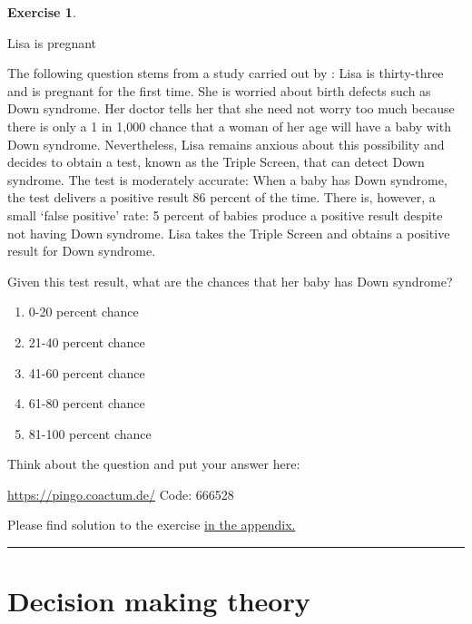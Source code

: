 \documentclass[
  12pt,
  oneside]{book}
\providecommand{\tightlist}{%
  \setlength{\itemsep}{0pt}\setlength{\parskip}{0pt}}
\theoremstyle{definition}
\theoremstyle{definition}
\theoremstyle{definition}
\newtheorem{exercise}{Exercise}[chapter]
\theoremstyle{definition}
\theoremstyle{remark}
\begin{document}
\begin{exercise}
\protect\hypertarget{exr:lisapregnant}{}\label{exr:lisapregnant}

Lisa is pregnant

The following question stems from a study carried out by \citet{Kahneman1972Subjective}: Lisa is thirty-three and is pregnant for the first time. She is worried about birth defects such as Down syndrome. Her doctor tells her that she need not worry too much because there is only a 1 in 1,000 chance that a woman of her age will have a baby with Down syndrome. Nevertheless, Lisa remains anxious about this possibility and decides to obtain a test, known as the Triple Screen, that can detect Down syndrome. The test is moderately accurate: When a baby has Down syndrome, the test delivers a positive result 86 percent of the time. There is, however, a small `false positive' rate: 5 percent of babies produce a positive result despite not having Down syndrome. Lisa takes the Triple Screen and obtains a positive result for Down syndrome.

Given this test result, what are the chances that her baby has Down syndrome?

\begin{enumerate}
\def\labelenumi{\alph{enumi})}
\tightlist
\item
  0-20 percent chance
\item
  21-40 percent chance
\item
  41-60 percent chance
\item
  61-80 percent chance
\item
  81-100 percent chance
\end{enumerate}

Think about the question and put your answer here:

\url{https://pingo.coactum.de/} Code: 666528

Please find solution to the exercise \hyperref[sol:lisapregnant]{in the appendix.}

\begin{center}\rule{0.5\linewidth}{0.5pt}\end{center}

\end{exercise}

\chapter{Decision making theory}\label{decision-making-theory}
\end{document}
